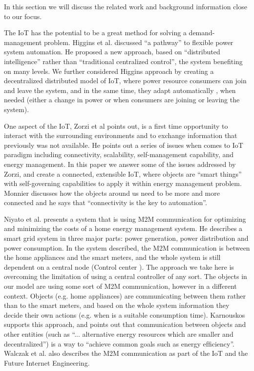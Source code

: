 \documentclass[letterpaper, 10 pt, conference]{ieeeconf}
\begin{document}
In this section we will discuss the related work and background information close to our focus.

The IoT has the potential to be a great method for solving a demand-management problem. Higgins et al. \cite{higgins2011distributed} discussed ``a pathway'' to flexible power system automation. He proposed a new approach, based on ``distributed intelligence'' rather than ``traditional centralized control'', the system benefiting on many levels. We further considered Higgins approach by creating a decentralized distributed model of IoT, where power resource consumers can join and leave the system, and in the same time, they adapt automatically \cite{bookIoT}, when needed (either a change in power or when consumers are joining or leaving the system).

One aspect of the IoT, Zorzi et al \cite{zorzi2010today} points out, is a first time opportunity to interact with the surrounding environments and to exchange information that previously was not available. He points out a series of issues when comes to IoT paradigm including connectivity, scalability, self-management capability, and energy management. In this paper we answer some of the issues addressed by Zorzi, and create a connected, extensible IoT, where objects are ``smart things'' with self-governing capabilities to apply it within energy management problem. Monnier \cite{whitePaper} discusses how the objects around us need to be more and more connected and he says that ``connectivity is the key to automation''.

Niyato et al. \cite{niyato2011machine} presents a system that is using M2M communication for optimizing and minimizing the costs of a home energy management system. He describes a smart grid system in three major parts: power generation, power distribution and power consumption. In the system described, the M2M communication is between the home appliances and the smart meters, and the whole system is still dependent on a central node (Control center \cite{niyato2011machine}). The approach we take here is overcoming the limitation of using a central controller of any sort. The objects in our model are using some sort of M2M communication, however in a different context. Objects (e.g. home appliances) are communicating between them rather than to the smart meters, and based on the whole system information they decide their own actions (e.g. when is a suitable consumption time). Karnouskos \cite{karnouskos2010cooperative} supports this approach, and points out that communication between objects and other entities (such as ``... alternative energy resources which are smaller and decentralized'') is a way to ``achieve common goals such as energy efﬁciency''. Walczak et al. \cite{walczak2012machine} also describes the M2M communication as part of the IoT and the Future Internet Engineering.
\end{document}
